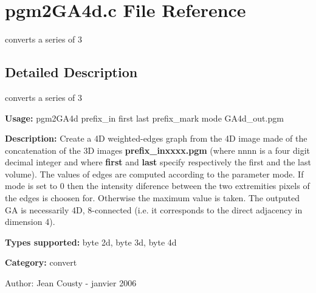\section{pgm2GA4d.c File Reference}
\label{pgm2GA4d_8c}
converts a series of 3  




\label{_details}
\subsection{Detailed Description}
converts a series of 3 

{\bf Usage:} pgm2GA4d prefix\_\-in first last prefix\_\-mark mode GA4d\_\-out.pgm

{\bf Description:} Create a 4D weighted-edges graph from the 4D image made of the concatenation of the 3D images {\bf prefix\_\-inxxxx.pgm} (where nnnn is a four digit decimal integer and where {\bf first} and {\bf last} specify respectively the first and the last volume). The values of edges are computed according to the parameter mode. If mode is set to 0 then the intensity diference between the two extremities pixels of the edges is choosen for. Otherwise the maximum value is taken. The outputed GA is necessarily 4D, 8-connected (i.e. it corresponds to the direct adjacency in dimension 4).

{\bf Types supported:} byte 2d, byte 3d, byte 4d

{\bf Category:} convert

\begin{Desc}
\item[Author:]Jean Cousty - janvier 2006 \end{Desc}
